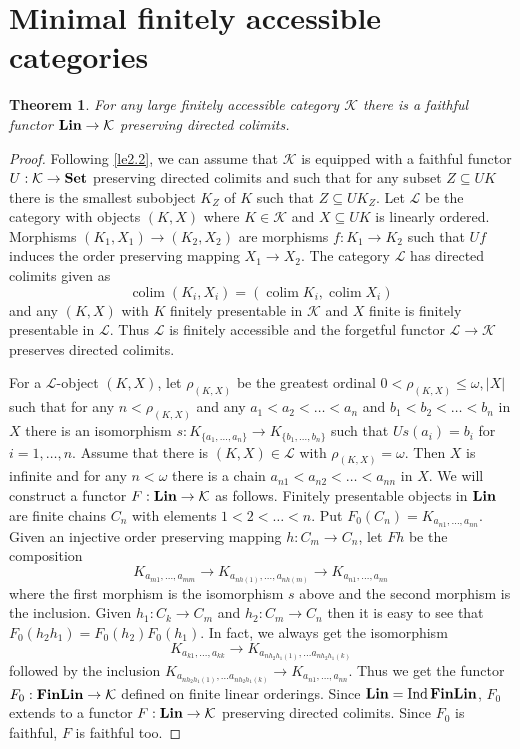\documentclass[12pt]{amsart}
\newtheorem{theo}{Theorem}[section]
\newcommand\Ind{\operatorname{Ind}}
\newcommand\Set{\operatorname{\bf Set}}
\newcommand\Lin{\operatorname{\bf Lin}}
\newcommand\FinLin{\operatorname{\bf FinLin}}
\newcommand\colim{\operatorname{colim}}
\newcommand\ck{\mathcal {K}}
\newcommand\cl{\mathcal {L}}
\begin{document}
\section{Minimal finitely accessible categories}
\begin{theo}\label{th3.1}
For any large finitely accessible category $\ck$ there is a faithful functor $\Lin\to\ck$ preserving directed colimits.
\end{theo}
\begin{proof}
Following \ref{le2.2}, we can assume that $\ck$ is equipped with a faithful functor $U:\ck\to\Set$ preserving directed colimits and such that
for any subset $Z\subseteq UK$ there is the smallest subobject $K_Z$ of $K$ such that $Z\subseteq UK_Z$. Let $\cl$ be the category with objects
$(K,X)$ where $K\in\ck$ and $X\subseteq UK$ is linearly ordered. Morphisms $(K_1,X_1)\to (K_2,X_2)$ are morphisms $f:K_1\to K_2$ such that
$Uf$ induces the order preserving mapping $X_1\to X_2$. The category $\cl$ has directed colimits given as
$$
\colim (K_i,X_i)=(\colim K_i,\colim X_i)
$$
and any $(K,X)$ with $K$ finitely presentable in $\ck$ and $X$ finite is finitely presentable in $\cl$. Thus $\cl$ is finitely accessible
and the forgetful functor $\cl\to\ck$ preserves directed colimits.

For a $\cl$-object $(K,X)$, let $\rho_{(K,X)}$ be the greatest ordinal $0<\rho_{(K,X)}\leq\omega,|X|$ such that for any $n<\rho_{(K,X)}$
and any $a_1< a_2<\dots <a_n$ and $b_1< b_2<\dots < b_n$ in $X$ there is an isomorphism $s:K_{\{a_1,\dots,a_n\}}\to K_{\{b_1,\dots,b_n\}}$ such
that $Us(a_i)=b_i$ for $i=1,\dots,n$. Assume that there is $(K,X)\in\cl$ with $\rho_{(K,X)}=\omega$. Then $X$ is infinite and for any $n<\omega$
there is a chain $a_{n1}< a_{n2}<\dots < a_{nn}$ in $X$. We will construct a functor $F:\Lin\to\ck$ as follows. Finitely presentable objects in $\Lin$
are finite chains $C_n$ with elements $1< 2<\dots <n$. Put $F_0(C_n)=K_{a_{n1},\dots,a_{nn}}$. Given an injective order preserving mapping $h:C_m\to C_n$, let
$Fh$ be the composition
$$
K_{a_{m1},\dots,a_{mm}}\to K_{a_{nh(1)},\dots,a_{nh(m)}}\to K_{a_{n1},\dots,a_{nn}}
$$
where the first morphism is the isomorphism $s$ above and the second morphism is the inclusion. Given $h_1:C_k\to C_m$ and $h_2:C_m\to C_n$ then
it is easy to see that $F_0(h_2h_1)=F_0(h_2)F_0(h_1)$.  In fact, we always get the isomorphism 
$$
K_{a_{k1},\dots,a_{kk}}\to K_{a_{nh_2h_1(1)},\dots a_{nh_2h_1(k)}}
$$
followed by the inclusion $K_{a_{nh_2h_1(1)},\dots a_{nh_2h_1(k)}}\to K_{a_{n1},\dots,a_{nn}}$. Thus we get the functor $F_0:\FinLin\to\ck$
defined on finite linear orderings. Since $\Lin=\Ind\FinLin$, $F_0$ extends to a functor $F:\Lin\to\ck$ preserving directed colimits.
Since $F_0$ is faithful, $F$ is faithful too.


\end{proof}
\end{document}
